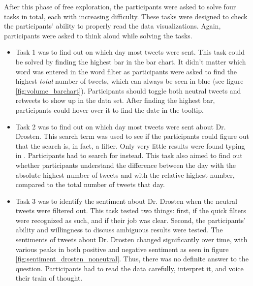 After this phase of free exploration, the participants were asked to solve four tasks in total, each with increasing difficulty. These tasks were designed to check the participants' ability to properly read the data visualizations. Again, participants were asked to think aloud while solving the tasks.
\begin{itemize}
    \item Task 1 was to find out on which day most tweets were sent. This task could be solved by finding the highest bar in the bar chart. It didn't matter which word was entered in the word filter as participants were asked to find the highest \emph{total} number of tweets, which can always be seen in blue (see figure \ref{fig:volume_barchart}). Participants should toggle both neutral tweets and retweets to show up in the data set. After finding the highest bar, participants could hover over it to find the date in the tooltip.
    \item Task 2 was to find out on which day most tweets were sent about Dr. Drosten. This search term was used to see if the participants could figure out that the search is, in fact, a filter. Only very little results were found typing in . Participants had to search for  instead. This task also aimed to find out whether participants understand the difference between the day with the absolute highest number of tweets and with the relative highest number, compared to the total number of tweets that day.
    \item Task 3 was to identify the sentiment about Dr. Drosten when the neutral tweets were filtered out. This task tested two things: first, if the quick filters were recognized as such, and if their job was clear. Second, the participants' ability and willingness to discuss ambiguous results were tested. The sentiments of tweets about Dr. Drosten changed significantly over time, with various peaks in both positive and negative sentiment as seen in figure \ref{fig:sentiment_drosten_noneutral}. Thus, there was no definite answer to the question. Participants had to read the data carefully, interpret it, and voice their train of thought.
    \begin{figure}[htb]

\end{figure}
\end{itemize}
